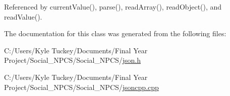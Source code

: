 Referenced by current\+Value(), parse(), read\+Array(), read\+Object(), and read\+Value().



The documentation for this class was generated from the following files\+:\begin{DoxyCompactItemize}
\item 
C\+:/\+Users/\+Kyle Tuckey/\+Documents/\+Final Year Project/\+Social\+\_\+\+N\+P\+C\+S/\+Social\+\_\+\+N\+P\+C\+S/\hyperlink{json_8h}{json.\+h}\item 
C\+:/\+Users/\+Kyle Tuckey/\+Documents/\+Final Year Project/\+Social\+\_\+\+N\+P\+C\+S/\+Social\+\_\+\+N\+P\+C\+S/\hyperlink{jsoncpp_8cpp}{jsoncpp.\+cpp}\end{DoxyCompactItemize}
